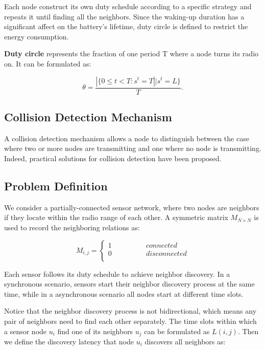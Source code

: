  Each node construct its own duty schedule according to a specific strategy and repeats it
 until finding all the neighbors. Since the waking-up duration has a significant affect on the battery's lifetime, 
 duty circle is defined to restrict the energy consumption.

\begin{definition}
\textbf{Duty circle} represents the fraction of one period T where a node turns its radio on. It can be formulated as:

$$\theta=\frac{|\{ 0\leq t<T : s^t = T || s^t = L\}}{T}.
$$
  
\end{definition}



\subsection{Collision Detection Mechanism}

A collision detection mechanism allows a node to distinguish between 
the case where two or more nodes are transmitting and one where no 
node is transmitting. Indeed, practical solutions for collision detection 
have been proposed. 





\subsection{Problem Definition}

We consider a partially-connected sensor network, 
where two nodes are neighbors if they locate within the radio range of each other. 
A  symmetric matrix $M_{N\times N}$ is used to record the neighboring relations as:

$$ M_{i,j}=\left\{
\begin{aligned}
1  & & & & & & {connected}\\
0  & & & & & & {disconnected}\\
\end{aligned}
\right.
$$

Each sensor follows its duty schedule to achieve neighbor discovery. In a synchronous scenario,
sensors start their neighbor discovery process at the same time, while in a asynchronous  scenario
all nodes start at different time slots.
 
Notice that the neighbor discovery process is not bidirectional, which means any pair of neighbors 
need to find each other separately. The time slots within which a sensor node $u_i$ find one of its neighbors $u_j$ can be formulated 
as $L(i,j)$. Then we define the discovery latency that node $u_i$ discovers all neighbors as:

